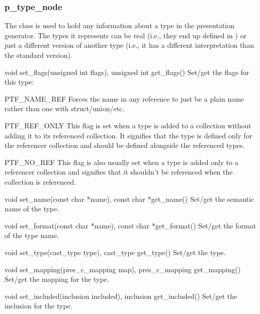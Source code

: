 \subsubsection{p_type_node}

The  class is used to hold any information about a type in
the presentation generator.  The types it represents can be real (i.e., they
end up defined in \CAST{}) or just a different version of another type (i.e.,
it has a different interpretation than the standard version).

\begin{cprototypelist}
  \item[void set_flags(unsigned int flags), unsigned int
  get_flags()] Set/get the flags for this type:

  \begin{cidentifierlist}
    \item[PTF_NAME_REF] Forces the name in any reference to just
    be a plain name rather than one with struct/union/etc.

    \item[PTF_REF_ONLY] This flag is set when a type is added to a
    collection without adding it to its referenced collection.  It signifies
    that the type is defined only for the referencer collection and should be
    defined alongside the referenced types.

    \item[PTF_NO_REF] This flag is also usually set when a type is
    added only to a referencer collection and signifies that it shouldn't be
    referenced when the collection is referenced.
  \end{cidentifierlist}

  \item[void set_name(const char *name), const char *get_name()]
  Set/get the semantic name of the type.

  \item[void set_format(const char *name), const char
  *get_format()] Set/get the format of the type name.

  \item[void set_type(cast_type type), cast_type get_type()]
  Set/get the \CAST{} type.

  \item[void set_mapping(pres_c_mapping map), pres_c_mapping
  get_mapping()] Set/get the mapping for the type.

  \item[void set_included(inclusion included), inclusion
  get_included()] Set/get the inclusion for the type.


\end{cprototypelist}
